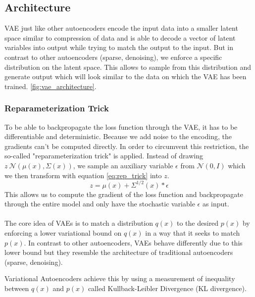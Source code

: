 \documentclass[twoside,11pt,a4paper]{article}
\theoremstyle{break}
\begin{document}
\subsection{Architecture}
\label{sub:vae_architecture}
VAE just like other autoencoders encode the input data into a smaller latent space similar to compression of data and is able to decode a vector of latent variables into output while trying to match the output to the input.
But in contrast to other autoencoders (sparse, denoising), we enforce a specific distribution on the latent space.
This allows to sample from this distribution and generate output which will look similar to the data on which the VAE has been trained.
\ref{fig:vae_architecture}.

\subsubsection{Reparameterization Trick}
To be able to backpropagate the loss function through the VAE, it has to be differentiable and deterministic.
Because we add noise to the encoding, the gradients can't be computed directly. In order to circumvent this restriction, the so-called "reparameterization trick" is applied.
Instead of drawing $z ~ \mathcal{N}(\mu(x), \Sigma(x))$, we sample an auxiliary variable $\epsilon$ from $\mathcal{N}(0, I)$ which we then transform with equation \ref{eq:rep_trick} into $z$.
\begin{equation}
  \label{eq:rep_trick}
  z = \mu(x) + \Sigma^{1/2}(x)*\epsilon
\end{equation}
This allows us to compute the gradient of the loss function and backpropagate through the entire model and only have the stochastic variable $\epsilon$ as input.\\\\

The core idea of VAEs is to match a distribution $q(x)$ to the desired $p(x)$ by enforcing a lower variational bound on $q(x)$ in a way that it seeks to match $p(x)$.
In contrast to other autoencoders, VAEs behave differently due to this lower bound but they resemble the architecture of traditional autoencoders (sparse, denoising).



Variational Autoencoders achieve this by using a measurement of inequality between $q(x)$ and $p(x)$ called Kullback-Leibler Divergence (KL divergence).

\end{document}
